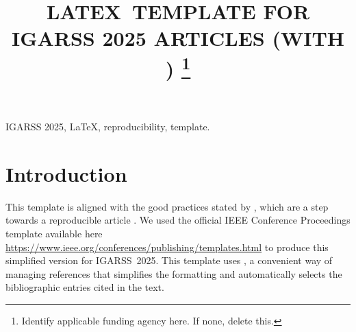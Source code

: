 \documentclass[conference,a4paper]{IEEEtran}
\begin{document}
\title{\uppercase{\LaTeX\ Template for IGARSS 2025 Articles (with \BibTeX)}
\thanks{Identify applicable funding agency here. If none, delete this.}
}

\author{	
	\and
	\and
}


\maketitle
\begin{abstract}  \end{abstract}

\begin{IEEEkeywords}
	IGARSS 2025, \LaTeX, reproducibility, template.
\end{IEEEkeywords}


\section{Introduction}

This template is aligned with the good practices stated by \citet{EditorialGRSL2015}, which are a step towards a reproducible article \citep{ABadgingSystemforReproducibilityandReplicabilityinRemoteSensingResearch}.
We used the official IEEE Conference Proceedings template available here \url{https://www.ieee.org/conferences/publishing/templates.html} to produce this simplified version for IGARSS~2025.
This template uses \BibTeX, a convenient way of managing references that simplifies the formatting and automatically selects the bibliographic entries cited in the text.
\end{document}

